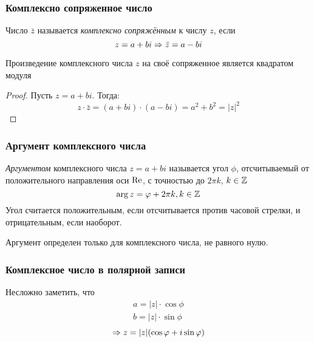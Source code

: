 \subsubsection*{Комплексно сопряженное число}

\begin{definition}
    Число $\bar{z}$ называется \textit{комплексно сопряжённым} к числу $z$, если
    $$
        z = a + bi \Rightarrow \bar{z} = a - bi
    $$
\end{definition}

\begin{proposition}
    Произведение комплексного числа $z$ на своё сопряженное является квадратом модуля
\end{proposition}

\begin{proof}
    Пусть $z = a + bi$. Тогда:
    $$
        z \cdot \bar{z} = (a + bi) \cdot (a - bi) = a^2 + b^2 = |z|^2
    $$
\end{proof}

\subsubsection*{Аргумент комплексного числа}

\begin{definition}
    \textit{Аргументом} комплексного числа $z = a + bi$ называется угол $\phi$, отсчитываемый от положительного направления оси $\operatorname{Re}$, с точностью до $2\pi k$, $k \in \mathbb{Z}$
    $$
        \arg z = \varphi + 2\pi k, k \in \mathbb{Z}
    $$
    Угол считается положительным, если отсчитывается против часовой стрелки, и отрицательным, если наоборот.
\end{definition}

\begin{note}
    Аргумент определен только для комплексного числа, не равного нулю.
\end{note}

\subsubsection*{Комплексное число в полярной записи}

\begin{definition}
    Несложно заметить, что
    \begin{align*}
        a = |z| \cdot \cos \phi \\
        b = |z| \cdot \sin \phi
    \end{align*}
    $$
        \Rightarrow z = |z|(\cos \varphi + i \sin \varphi)
    $$
\end{definition}

